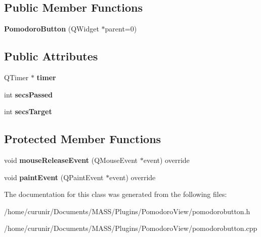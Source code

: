 \subsection*{Public Member Functions}
\begin{DoxyCompactItemize}
\item 
{\bfseries Pomodoro\+Button} (Q\+Widget $\ast$parent=0)\hypertarget{class_pomodoro_button_af566cac51b9c2ddba1b26ced5ed01de1}{}\label{class_pomodoro_button_af566cac51b9c2ddba1b26ced5ed01de1}

\end{DoxyCompactItemize}
\subsection*{Public Attributes}
\begin{DoxyCompactItemize}
\item 
Q\+Timer $\ast$ {\bfseries timer}\hypertarget{class_pomodoro_button_ab42338e4ce1e5d0f8acbe73565177e41}{}\label{class_pomodoro_button_ab42338e4ce1e5d0f8acbe73565177e41}

\item 
int {\bfseries secs\+Passed}\hypertarget{class_pomodoro_button_a6587b4babb2f78e4ee99de6c3bfd2e48}{}\label{class_pomodoro_button_a6587b4babb2f78e4ee99de6c3bfd2e48}

\item 
int {\bfseries secs\+Target}\hypertarget{class_pomodoro_button_a32cc630ba2b255bda7dfaf0b7209b79b}{}\label{class_pomodoro_button_a32cc630ba2b255bda7dfaf0b7209b79b}

\end{DoxyCompactItemize}
\subsection*{Protected Member Functions}
\begin{DoxyCompactItemize}
\item 
void {\bfseries mouse\+Release\+Event} (Q\+Mouse\+Event $\ast$event) override\hypertarget{class_pomodoro_button_a75802646c43d4f9ffd4d7e5b4c20be8b}{}\label{class_pomodoro_button_a75802646c43d4f9ffd4d7e5b4c20be8b}

\item 
void {\bfseries paint\+Event} (Q\+Paint\+Event $\ast$event) override\hypertarget{class_pomodoro_button_afb688dd2937945dd444a63999ef69ece}{}\label{class_pomodoro_button_afb688dd2937945dd444a63999ef69ece}

\end{DoxyCompactItemize}


The documentation for this class was generated from the following files\+:\begin{DoxyCompactItemize}
\item 
/home/curunir/\+Documents/\+M\+A\+S\+S/\+Plugins/\+Pomodoro\+View/pomodorobutton.\+h\item 
/home/curunir/\+Documents/\+M\+A\+S\+S/\+Plugins/\+Pomodoro\+View/pomodorobutton.\+cpp\end{DoxyCompactItemize}
